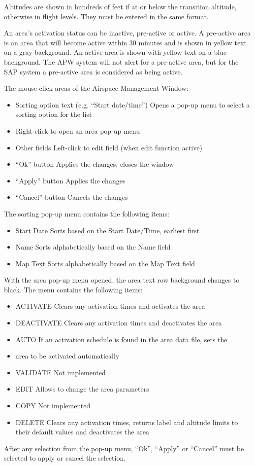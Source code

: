 \documentclass[11pt,a4paper]{memoir}
\begin{document}
Altitudes are shown in hundreds of feet if at or below the transition altitude, otherwise in flight levels. They must be entered in the same format.

An area’s activation status can be inactive, pre-active or active. A pre-active area is an area that will become active within 30 minutes and is shown in yellow text on a gray background. An active area is shown with yellow text on a blue background. The APW system will not alert for a pre-active area, but for the SAP system a pre-active area is considered as being active.

The mouse click areas of the Airspace Management Window:
\begin{itemize}[\textbullet] 
        \item Sorting option text (e.g. “Start date/time”) Opens a pop-up menu to select a sorting option for the list 
        \item Right-click to open an area pop-up menu
        \item Other fields Left-click to edit field (when edit function active)
        \item “Ok” button Applies the changes, closes the window
        \item “Apply” button Applies the changes
        \item “Cancel” button Cancels the changes 
\end{itemize}

The sorting pop-up menu contains the following items:
\begin{itemize}[\textbullet] 
        \item Start Date Sorts based on the Start Date/Time, earliest first
        \item Name Sorts alphabetically based on the Name field
        \item Map Text Sorts alphabetically based on the Map Text field 
\end{itemize}
With the area pop-up menu opened, the area text row background changes to black. The menu contains the following items:
\begin{itemize}[\textbullet] 
        \item ACTIVATE Clears any activation times and activates the area
        \item DEACTIVATE Clears any activation times and deactivates the area
        \item AUTO If an activation schedule is found in the area data file, sets the
        \item area to be activated automatically
        \item VALIDATE Not implemented
        \item EDIT Allows to change the area parameters
        \item COPY Not implemented
        \item DELETE Clears any activation times, returns label and altitude limits to their default values and deactivates the area
\end{itemize}
After any selection from the pop-up menu, “Ok”, “Apply” or “Cancel” must be selected to apply or cancel the selection. 
\end{document}
